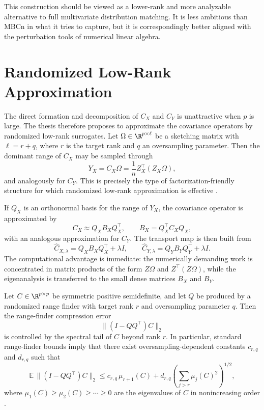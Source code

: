 This construction should be viewed as a lower-rank and more analyzable alternative to full multivariate distribution matching. It is less ambitious than MBCn in what it tries to capture, but it is correspondingly better aligned with the perturbation tools of numerical linear algebra.

\section{Randomized Low-Rank Approximation}

The direct formation and decomposition of \(C_X\) and \(C_Y\) is unattractive when \(p\) is large. The thesis therefore proposes to approximate the covariance operators by randomized low-rank surrogates. Let \(\Omega \in \R^{p \times \ell}\) be a sketching matrix with \(\ell = r + q\), where \(r\) is the target rank and \(q\) an oversampling parameter. Then the dominant range of \(C_X\) may be sampled through
\[
	Y_X = C_X \Omega = \frac{1}{n} Z_X^\top (Z_X \Omega),
\]
and analogously for \(C_Y\). This is precisely the type of factorization-friendly structure for which randomized low-rank approximation is effective \cite{halko2011finding,martinsson2020randnla}.

If \(Q_X\) is an orthonormal basis for the range of \(Y_X\), the covariance operator is approximated by
\[
	C_X \approx Q_X B_X Q_X^\top,
	\qquad
	B_X = Q_X^\top C_X Q_X,
\]
with an analogous approximation for \(C_Y\). The transport map is then built from
\[
	\widehat C_{X,\lambda} = Q_X B_X Q_X^\top + \lambda I,
	\qquad
	\widehat C_{Y,\lambda} = Q_Y B_Y Q_Y^\top + \lambda I.
\]
The computational advantage is immediate: the numerically demanding work is concentrated in matrix products of the form \(Z\Omega\) and \(Z^\top(Z\Omega)\), while the eigenanalysis is transferred to the small dense matrices \(B_X\) and \(B_Y\).

\begin{proposition}
	Let \(C \in \R^{p \times p}\) be symmetric positive semidefinite, and let \(Q\)
	be produced by a randomized range finder with target rank \(r\) and oversampling
	parameter \(q\). Then the range-finder compression error
	\[
		\|(I-QQ^\top)C\|_2
	\]
	is controlled by the spectral tail of \(C\) beyond rank \(r\). In particular,
	standard range-finder bounds imply that there exist oversampling-dependent
	constants \(c_{r,q}\) and \(d_{r,q}\) such that
	\[
		\mathbb{E}\,\|(I-QQ^\top)C\|_2
		\le
		c_{r,q}\,\mu_{r+1}(C)
		+
		d_{r,q}\left(\sum_{j>r} \mu_j(C)^2\right)^{1/2},
	\]
	where \(\mu_1(C) \ge \mu_2(C) \ge \cdots \ge 0\) are the eigenvalues of
	\(C\) in nonincreasing order \cite[Chs.~10--11]{halko2011finding}
	\cite[Sec.~8]{martinsson2020randnla}.
\end{proposition}

